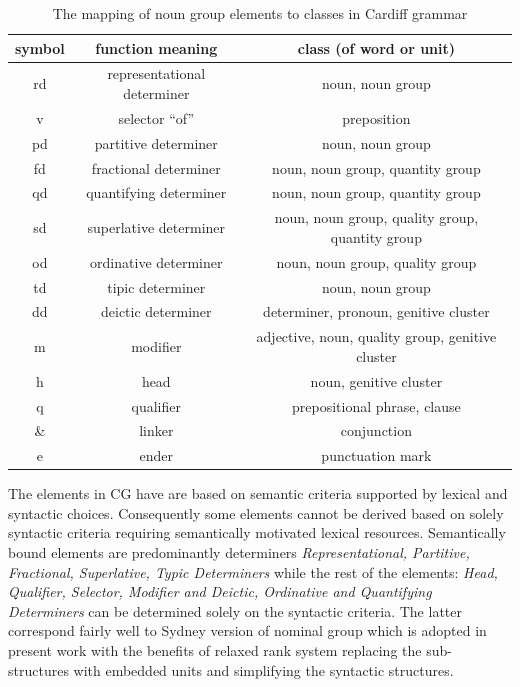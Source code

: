 	\begin{table}[h]
		\begin{tabular}{|c|c|c|}
			\hline
			\textbf{symbol} & \textbf{function meaning} & \textbf{class (of word or unit)} \\ \hline
			rd & representational determiner & noun, noun group \\ \hline
			v & selector ``of'' & preposition \\ \hline
			pd & partitive determiner & noun, noun group \\ \hline
			fd & fractional determiner & noun, noun group, quantity group \\ \hline
			qd & quantifying determiner & noun, noun group, quantity group \\ \hline
			sd & superlative determiner & noun, noun group, quality group, quantity group \\ \hline
			od & ordinative determiner & noun, noun group, quality group \\ \hline
			td & tipic determiner & noun, noun group \\ \hline
			dd & deictic determiner & determiner, pronoun, genitive cluster \\ \hline
			m & modifier & adjective, noun, quality group, genitive cluster \\ \hline
			h & head & noun, genitive cluster \\ \hline
			q & qualifier & prepositional phrase, clause \\ \hline
			\& & linker & conjunction \\ \hline
			e & ender & punctuation mark \\ \hline
		\end{tabular}
		\caption{The mapping of noun group elements to classes in Cardiff grammar}
		\label{tab:cg-mappings}
	\end{table}
	
	The elements in CG have are based on semantic criteria supported by lexical and syntactic choices. Consequently some elements cannot be derived based on solely syntactic criteria requiring semantically motivated lexical resources. Semantically bound elements are predominantly determiners \textit{Representational, Partitive, Fractional, Superlative, Typic Determiners} while the rest of the elements: \textit{Head, Qualifier, Selector, Modifier and Deictic, Ordinative and Quantifying Determiners} can be determined solely on the syntactic criteria. The latter correspond fairly well to Sydney version of nominal group which is adopted in present work with the  benefits of relaxed rank system replacing the sub-structures with embedded units and simplifying the syntactic structures. 
	
